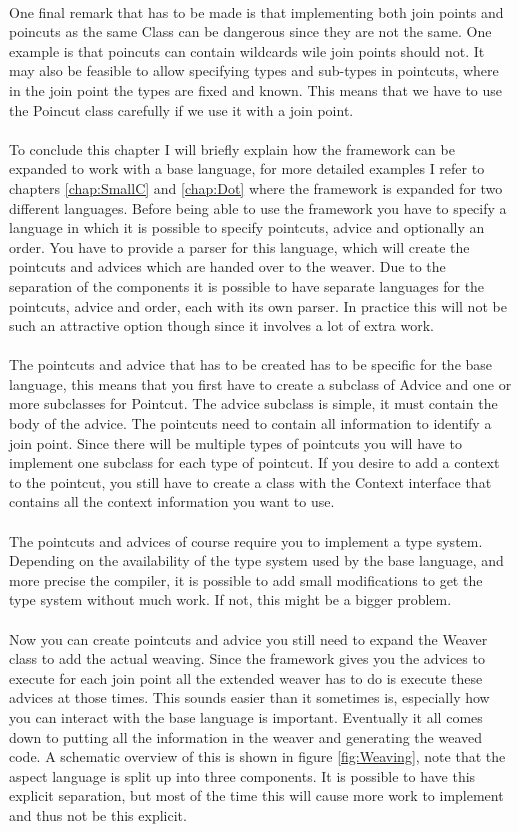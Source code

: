 \documentclass[a4paper]{report}
\begin{document}
\\
One final remark that has to be made is that implementing both join points and poincuts as the same Class can be dangerous since they are not the same. One example is that poincuts can contain wildcards wile join points should not. It may also be feasible to allow specifying types and sub-types in pointcuts, where in the join point the types are fixed and known. This means that we have to use the Poincut class carefully if we use it with a join point.\\
\\
To conclude this chapter I will briefly explain how the framework can be expanded to work with a base language, for more detailed examples I refer to chapters \ref{chap:SmallC} and \ref{chap:Dot} where the framework is expanded for two different languages. Before being able to use the framework you have to specify a language in which it is possible to specify pointcuts, advice and optionally an order. You have to provide a parser for this language, which will create the pointcuts and advices which are handed over to the weaver. Due to the separation of the components it is possible to have separate languages for the pointcuts, advice and order, each with its own parser. In practice this will not be such an attractive option though since it involves a lot of extra work.\\
\\
The pointcuts and advice that has to be created has to be specific for the base language, this means that you first have to create a subclass of Advice and one or more subclasses for Pointcut.
The advice subclass is simple, it must contain the body of the advice. The pointcuts need to contain all information to identify a join point. Since there will be multiple types of pointcuts you will have to implement one subclass for each type of pointcut. If you desire to add a context to the pointcut, you still have to create a class with the Context interface that contains all the context information you want to use.\\
\\
The pointcuts and advices of course require you to implement a type system. Depending on the availability of the type system used by the base language, and more precise the compiler, it is possible to add small modifications to get the type system without much work. If not, this might be a bigger problem.\\
\\
Now you can create pointcuts and advice you still need to expand the Weaver class to add the actual weaving. Since the framework gives you the advices to execute for each join point all the extended weaver has to do is execute these advices at those times. This sounds easier than it sometimes is, especially how you can interact with the base language is important. Eventually it all comes down to putting all the information in the weaver and generating the weaved code. A schematic overview of this is shown in figure \ref{fig:Weaving}, note that the aspect language is split up into three components. It is possible to have this explicit separation, but most of the time this will cause more work to implement and thus not be this explicit.
\end{document}

